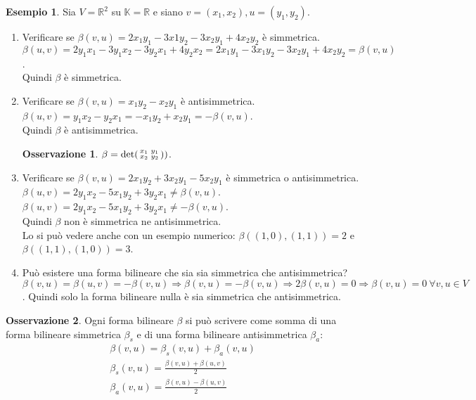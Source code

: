 \documentclass[a4paper]{article}
\theoremstyle{definition}
\newtheorem*{oss}{Osservazione}
\newtheorem*{es}{Esempio}
\begin{document}
	\begin{es}
		Sia $V = \mathbb{R}^2$ su $\mathbb{K} = \mathbb{R}$ e siano $v = (x_1, x_2), u = (y_1, y_2)$.
		\begin{enumerate}
			\item Verificare se $\beta(v, u) = 2x_1y_1 - 3x1y_2 - 3x_2y_1 + 4x_2y_2$ è simmetrica. \\
			$\beta(u, v) = 2y_1x_1 - 3y_1x_2 - 3y_2x_1 + 4y_2x_2 = 2x_1y_1 - 3x_1y_2 - 3x_2y_1 + 4x_2y_2 = \beta(v, u)$. \\
			Quindi $\beta$ è simmetrica.
			
			\item Verificare se $\beta(v, u) =x_1y_2 - x_2y_1$ è antisimmetrica. \\
			$\beta(u, v) = y_1x_2 - y_2x_1 = -x_1y_2 + x_2y_1 = -\beta(v, u)$. \\
			Quindi $\beta$ è antisimmetrica.
			\begin{oss}
				$\beta = \det \begin{psmallmatrix}
					x_1 & y_1 \\
					x_2 & y_2
				\end{psmallmatrix})$.
			\end{oss}
			
			\item Verificare se $\beta(v, u) = 2x_1y_2 + 3x_2y_1 - 5x_2y_1$ è simmetrica o antisimmetrica. \\
			$\beta(u, v) = 2y_1x_2 - 5x_1y_2 + 3y_2x_1 \ne \beta(v, u)$. \\
			$\beta(u, v) = 2y_1x_2 - 5x_1y_2 + 3y_2x_1 \ne -\beta(v, u)$. \\
			Quindi $\beta$ non è simmetrica ne antisimmetrica. \\
			Lo si può vedere anche con un esempio numerico: $\beta((1, 0), (1, 1)) = 2$ e $\beta((1, 1), (1, 0)) = 3$.
			
			\item Può esistere una forma bilineare che sia sia simmetrica che antisimmetrica? \\
			$\beta(v, u) = \beta(u, v) = -\beta(v, u) \Rightarrow \beta(v, u) = -\beta(v, u) \Rightarrow 2\beta(v, u) = 0 \Rightarrow \beta(v, u) = 0 \ \forall v, u \in V$.
			Quindi solo la forma bilineare nulla è sia simmetrica che antisimmetrica.
		\end{enumerate}
	\end{es}

	\begin{oss}
		Ogni forma bilineare $\beta$ si può scrivere come somma di una forma bilineare simmetrica $\beta_s$ e di una forma bilineare antisimmetrica $\beta_a$:
		\begin{align*}
			\beta(v, u) = \beta_s(v, u) + \beta_a(v, u) \\
			\beta_s(v, u) = \frac{\beta(v, u) + \beta(u, v)}{2} \\
			\beta_a(v, u) = \frac{\beta(v, u) - \beta(u, v)}{2}
		\end{align*}
	\end{oss}
\end{document}
